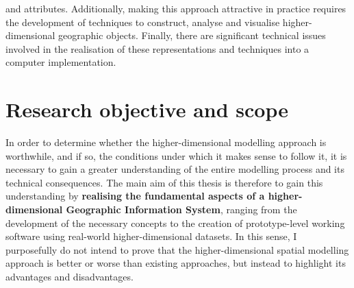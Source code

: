 and attributes.
Additionally, making this approach attractive in practice requires the development of techniques to construct, analyse and visualise higher-dimensional geographic objects.
Finally, there are significant technical issues involved in the realisation of these representations and techniques into a computer implementation.

\section{Research objective and scope}
\label{se:objective}

In order to determine whether the higher-dimensional modelling approach is worthwhile, and if so, the conditions under which it makes sense to follow it, it is necessary to gain a greater understanding of the entire modelling process and its technical consequences.
The main aim of this thesis is therefore to gain this understanding by \textbf{realising the fundamental aspects of a higher-dimensional Geographic Information System}, ranging from the development of the necessary concepts to the creation of prototype-level working software using real-world higher-dimensional datasets.
In this sense, I purposefully do not intend to prove that the higher-dimensional spatial modelling approach is better or worse than existing approaches, but instead to highlight its advantages and disadvantages.

